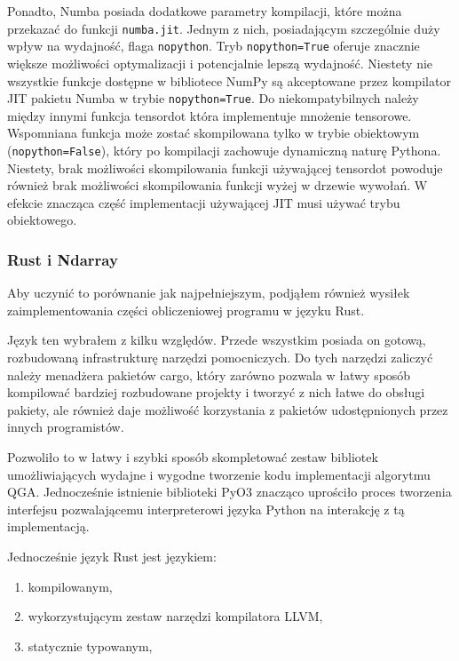 \documentclass[11pt, a4paper]{article}
\newcommand{\code}[1]{\texttt{#1}}
\begin{document}
\begin{sloppypar}
    Ponadto, Numba posiada dodatkowe parametry kompilacji, które można przekazać do funkcji
    \code{numba.jit}. Jednym z nich, posiadającym szczególnie duży wpływ na wydajność, flaga
    \code{nopython}. Tryb \code{nopython=True} oferuje znacznie większe możliwości
    optymalizacji i potencjalnie lepszą wydajność. Niestety nie wszystkie funkcje dostępne
    w bibliotece NumPy są akceptowane przez kompilator JIT pakietu Numba w trybie \code{nopython=True}.
    Do niekompatybilnych należy między innymi funkcja tensordot która implementuje mnożenie
    tensorowe. Wspomniana funkcja może zostać skompilowana tylko w trybie obiektowym (\code{nopython=False}),
    który po kompilacji zachowuje dynamiczną naturę Pythona. Niestety, brak możliwości
    skompilowania funkcji używającej tensordot powoduje również brak możliwości
    skompilowania funkcji wyżej w drzewie wywołań. W efekcie znacząca część implementacji
    używającej JIT musi używać trybu obiektowego.

    \subsubsection{Rust i Ndarray}
    Aby uczynić to porównanie jak najpełniejszym, podjąłem również wysiłek
    zaimplementowania części obliczeniowej programu w języku Rust.

    Język ten wybrałem z kilku względów. Przede wszystkim posiada on gotową, rozbudowaną
    infrastrukturę narzędzi pomocniczych. Do tych narzędzi zaliczyć należy menadżera pakietów
    cargo, który zarówno pozwala w łatwy sposób kompilować bardziej rozbudowane projekty
    i tworzyć z nich łatwe do obsługi pakiety, ale również daje możliwość korzystania z pakietów
    udostępnionych przez innych programistów.

    Pozwoliło to w łatwy i szybki sposób skompletować zestaw bibliotek umożliwiających wydajne
    i wygodne tworzenie kodu implementacji algorytmu QGA. Jednocześnie istnienie
    biblioteki PyO3 znacząco uprościło proces tworzenia interfejsu pozwalającemu
    interpreterowi języka Python na interakcję z tą implementacją.

    Jednocześnie język Rust jest językiem:
    \begin{enumerate}
      \item kompilowanym,

      \item wykorzystującym zestaw narzędzi kompilatora LLVM,

      \item statycznie typowanym,


\end{enumerate}
\end{sloppypar}
\end{document}
